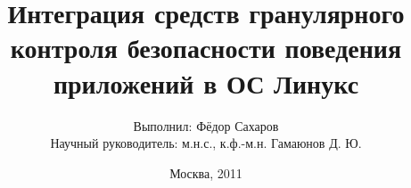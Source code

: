 \documentclass{beamer}
\makeatletter
\def\watermarkoff{\def\beamer@decolines@watermark{}}
\makeatother
\begin{document}
\title{Интеграция средств гранулярного контроля безопасности поведения
        приложений в ОС Линукс}  
\author{\small{Выполнил: Фёдор Сахаров}\\ \small{Научный руководитель: м.н.с., к.ф.-м.н. Гамаюнов Д. Ю.}}
\date{Москва, 2011} 
\begin{frame}[t, plain] 
\watermarkoff
 \titlepage
\end{frame}


\begin{comment}
\begin{frame}{Задача контроля поведения приложения на узлах.}
\watermarkoff
\begin{block}{Контроль поведения приложения на узлах}
 \begin{itemize}
  \item Использование уязвимости в программном обеспечении для получения доступа к системе.
  \item Повышение уровня безопасности за счет дополнения системы механизмами контроля поведения приложений. 
\end{itemize}
\end{block}

\begin{block}{Принципы на которых должен строится контроль поведения приложений}
    \begin{enumerate}
      \item Давать только необходимые привилегии и никакие другие.
      \item Давать привилегии только тем частям программы, которым они действительно нужны.
      \end{enumerate}
\end{block}
\end{frame}

\begin{frame}{Введение в предметную область. SELinux}
\begin{center}
\scalebox{.40}{
\texttt{[image: selinux.png]}
}
\end{center}
\end{frame}




\end{comment}
\end{document}
